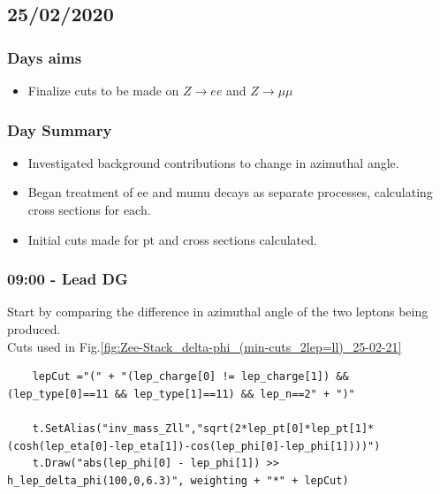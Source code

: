 \subsection*{\textbf{25/02/2020}}
\subsubsection*{Days aims}
\begin{itemize}
    \item Finalize cuts to be made on $Z \rightarrow ee$ and $Z \rightarrow \mu\mu$
\end{itemize}

\subsubsection*{Day Summary}
\begin{itemize}
    \item Investigated background contributions to change in azimuthal angle.
    \item Began treatment of ee and mumu decays as separate processes, calculating cross sections for each.
    \item Initial cuts made for pt and cross sections calculated.
  
\end{itemize}


\subsubsection*{09:00 - Lead DG}
Start by comparing the difference in azimuthal angle of the two leptons being produced.
\\
Cuts used in Fig.\ref{fig:Zee-Stack_delta-phi_(min-cuts_2lep=ll)_25-02-21}
\begin{lstlisting}
    lepCut ="(" + "(lep_charge[0] != lep_charge[1]) && (lep_type[0]==11 && lep_type[1]==11) && lep_n==2" + ")"
    
    t.SetAlias("inv_mass_Zll","sqrt(2*lep_pt[0]*lep_pt[1]*(cosh(lep_eta[0]-lep_eta[1])-cos(lep_phi[0]-lep_phi[1])))")
    t.Draw("abs(lep_phi[0] - lep_phi[1]) >> h_lep_delta_phi(100,0,6.3)", weighting + "*" + lepCut)
\end{lstlisting}

